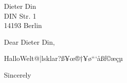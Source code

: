 \documentclass{defaultLetter}
\date{ 21.01.1984}
\begin{document}
\begin{letter}{  Dieter Din \\ DIN Str. 1 \\ 14193 Berlin }
\opening{Dear Dieter Din,}\par\addvspace{\medskipamount}\noindent
HalloWelt@|lsklar?ß¥œ®†¥ø“‘åßƒ©æçµ
\vfill
\closing{Sincerely}
\vfill
\end{letter}
\end{document}
